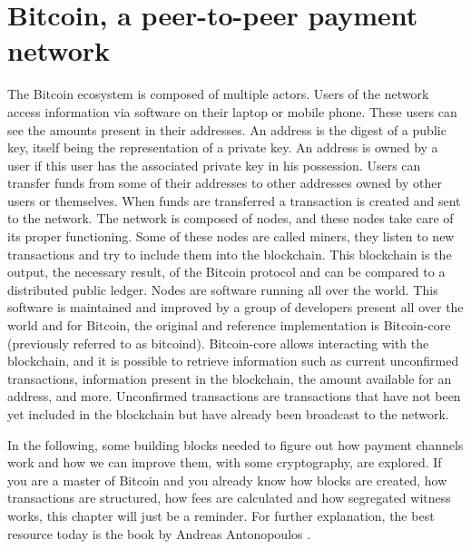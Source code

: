 \chapter{Bitcoin, a peer-to-peer payment network}
\label{chap:bitcoin}

The Bitcoin ecosystem is composed of multiple actors. Users of the network
access information via software on their laptop or mobile phone. These users can
see the amounts present in their addresses. An address is the digest of a public
key, itself being the representation of a private key. An address is owned by a
user if this user has the associated private key in his possession. Users can
transfer funds from some of their addresses to other addresses owned by other
users or themselves. When funds are transferred a transaction is created and
sent to the network. The network is composed of nodes, and these nodes take care
of its proper functioning. Some of these nodes are called miners, they listen to
new transactions and try to include them into the blockchain. This blockchain is
the output, the necessary result, of the Bitcoin protocol and can be compared to
a distributed public ledger. Nodes are software running all over the world. This
software is maintained and improved by a group of developers present all over
the world and for Bitcoin, the original and reference implementation is
Bitcoin-core (previously referred to as bitcoind). Bitcoin-core allows interacting with the blockchain, and it is
possible to retrieve information such as current unconfirmed transactions,
information present in the blockchain, the amount available for an address, and
more. Unconfirmed transactions are transactions that have not been yet included
in the blockchain but have already been broadcast to the network.

In the following, some building blocks needed to figure out how payment channels
work and how we can improve them, with some cryptography, are explored. If you
are a master of Bitcoin and you already know how blocks are created, how
transactions are structured, how fees are calculated and how segregated witness
works, this chapter will just be a reminder. For further explanation, the best
resource today is the book  by Andreas Antonopoulos
\cite{Antonopoulos:2014:MBU:2695500}.


\minitoc

\newpage

